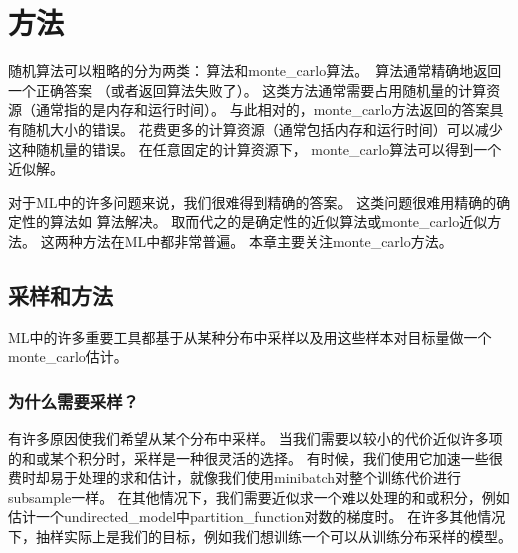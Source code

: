 \chapter{方法}
\label{chap:monte_carlo_methods}

随机算法可以粗略的分为两类：\,算法和\gls{monte_carlo}算法。
\,算法通常精确地返回一个正确答案 （或者返回算法失败了）。   
这类方法通常需要占用随机量的计算资源（通常指的是内存和运行时间）。    %
与此相对的，\gls{monte_carlo}方法返回的答案具有随机大小的错误。 
花费更多的计算资源（通常包括内存和运行时间）可以减少这种随机量的错误。 %
在任意固定的计算资源下， \gls{monte_carlo}算法可以得到一个近似解。

对于\gls{ML}中的许多问题来说，我们很难得到精确的答案。
这类问题很难用精确的确定性的算法如\,\,算法解决。%
取而代之的是确定性的近似算法或\gls{monte_carlo}近似方法。
这两种方法在\gls{ML}中都非常普遍。
本章主要关注\gls{monte_carlo}方法。

\section{采样和方法}
\label{sec:sampling_and_monte_carlo_methods}

\gls{ML}中的许多重要工具都基于从某种分布中采样以及用这些样本对目标量做一个\gls{monte_carlo}估计。  %

\subsection{为什么需要采样？}
\label{sec:why_sampling}

有许多原因使我们希望从某个分布中采样。  
当我们需要以较小的代价近似许多项的和或某个积分时，采样是一种很灵活的选择。  
有时候，我们使用它加速一些很费时却易于处理的求和估计，就像我们使用\gls{minibatch}对整个训练代价进行\gls{subsample}一样。  %
在其他情况下，我们需要近似求一个难以处理的和或积分，例如估计一个\gls{undirected_model}中\gls{partition_function}对数的梯度时。   %
在许多其他情况下，抽样实际上是我们的目标，例如我们想训练一个可以从训练分布采样的模型。  

